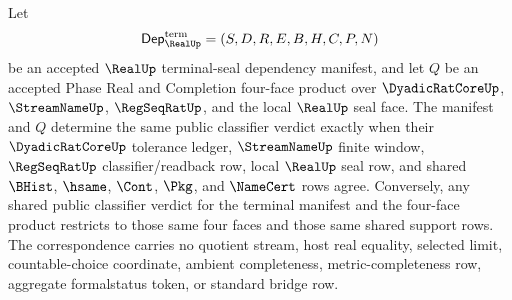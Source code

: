 \begin{theorem}
\label{thm:real-terminal-seal-four-face-classifier-correspondence}
Let
$$
\mathsf{Dep}_{\RealUp}^{\mathrm{term}}=(S,D,R,E,B,H,C,P,N)
$$
be an accepted $\RealUp$ terminal-seal dependency manifest, and let $Q$ be an
accepted Phase Real and Completion four-face product over
$\DyadicRatCoreUp$, $\StreamNameUp$, $\RegSeqRatUp$, and the local $\RealUp$
seal face. The manifest and $Q$ determine the same public classifier verdict
exactly when their $\DyadicRatCoreUp$ tolerance ledger, $\StreamNameUp$ finite
window, $\RegSeqRatUp$ classifier/readback row, local $\RealUp$ seal row, and
shared $\BHist$, $\hsame$, $\Cont$, $\Pkg$, and $\NameCert$ rows agree.
Conversely, any shared public classifier verdict for the terminal manifest and
the four-face product restricts to those same four faces and those same shared
support rows. The correspondence carries no quotient stream, host real
equality, selected limit, countable-choice coordinate, ambient completeness,
metric-completeness row, aggregate formalstatus token, or standard bridge row.
\end{theorem}
